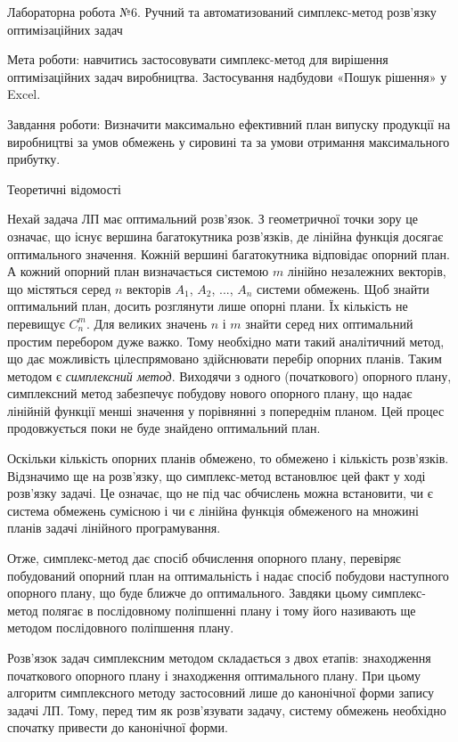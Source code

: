 \noindent Лабораторна робота №6. Ручний та автоматизований симплекс-метод розв’язку оптимізаційних задач

\medskip

\noindent Мета роботи: навчитись застосовувати симплекс-метод для вирішення оптимізаційних задач виробництва. Застосування надбудови «Пошук рішення» у Excel.

\medskip

\noindent Завдання роботи: Визначити максимально ефективний план випуску продукції на виробництві за умов обмежень у сировині та за умови отримання максимального прибутку.

\medskip

\noindent Теоретичні відомості

\noindent Нехай задача ЛП має оптимальний розв’язок. З геометричної точки зору це означає, що існує вершина багатокутника розв’язків, де лінійна функція досягає оптимального значення. Кожній вершині багатокутника відповідає опорний план. А кожний опорний план визначається системою $m$ лінійно незалежних векторів, що містяться серед $n$ векторів $A_1$, $A_2$, ..., $A_n$ системи обмежень. Щоб знайти оптимальний план, досить розглянути лише опорні плани. Їх кількість не перевищує $C_n^m$. Для великих значень $n$ і $m$ знайти серед них оптимальний простим перебором дуже важко. Тому необхідно мати такий аналітичний метод, що дає можливість цілеспрямовано здійснювати перебір опорних планів. Таким методом є \textit{симплексний метод}. Виходячи з одного (початкового) опорного плану, симплексний метод забезпечує побудову нового опорного плану, що надає лінійній функції менші значення у порівнянні з попереднім планом. Цей процес продовжується поки не буде знайдено оптимальний план.

\noindent Оскільки кількість опорних планів обмежено, то обмежено і кількість розв’язків. Відзначимо ще на розв’язку, що симплекс-метод встановлює цей факт у ході розв’язку задачі. Це означає, що не під час обчислень можна встановити, чи є система обмежень сумісною і чи є лінійна функція обмеженого на множині планів задачі лінійного програмування.

\noindent Отже, симплекс-метод дає спосіб обчислення опорного плану, перевіряє побудований опорний план на оптимальність і надає спосіб побудови наступного опорного плану, що буде ближче до оптимального. Завдяки цьому симплекс-метод полягає в послідовному поліпшенні плану і тому його називають ще методом послідовного поліпшення плану.

\noindent Розв’язок задач симплексним методом складається з двох етапів: знаходження початкового опорного плану і знаходження оптимального плану. При цьому алгоритм симплексного методу застосовний лише до канонічної форми запису задачі ЛП. Тому, перед тим як розв’язувати задачу, систему обмежень необхідно спочатку привести до канонічної форми.

